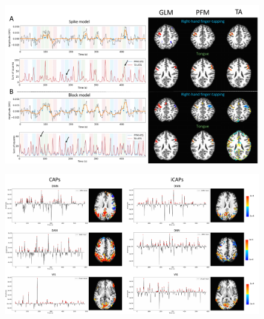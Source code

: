 \begin{figure}[t!]
    \begin{center}
        \includegraphics[width=\textwidth]{figures/task_maps.pdf}
    \end{center}
    \caption{}
\label{fig:task_maps}
\end{figure}

\begin{figure}[t!]
    \begin{center}
        \includegraphics[width=\textwidth]{figures/caps.pdf}
    \end{center}
    \caption{}
\label{fig:caps}
\end{figure}